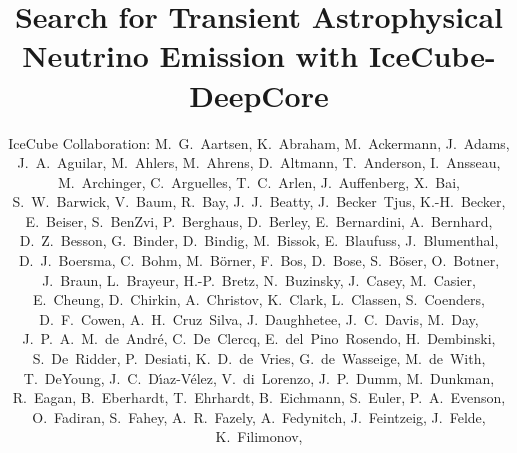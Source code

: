 \documentclass[manuscript]{aastex}
\begin{document}
\title{Search for Transient Astrophysical Neutrino Emission with IceCube-DeepCore}
\author{
IceCube Collaboration:
M.~G.~Aartsen,
K.~Abraham,
M.~Ackermann,
J.~Adams,
J.~A.~Aguilar,
M.~Ahlers,
M.~Ahrens,
D.~Altmann,
T.~Anderson,
I.~Ansseau,
M.~Archinger,
C.~Arguelles,
T.~C.~Arlen,
J.~Auffenberg,
X.~Bai,
S.~W.~Barwick,
V.~Baum,
R.~Bay,
J.~J.~Beatty,
J.~Becker~Tjus,
K.-H.~Becker,
E.~Beiser,
S.~BenZvi,
P.~Berghaus,
D.~Berley,
E.~Bernardini,
A.~Bernhard,
D.~Z.~Besson,
G.~Binder,
D.~Bindig,
M.~Bissok,
E.~Blaufuss,
J.~Blumenthal,
D.~J.~Boersma,
C.~Bohm,
M.~B\"orner,
F.~Bos,
D.~Bose,
S.~B\"oser,
O.~Botner,
J.~Braun,
L.~Brayeur,
H.-P.~Bretz,
N.~Buzinsky,
J.~Casey,
M.~Casier,
E.~Cheung,
D.~Chirkin,
A.~Christov,
K.~Clark,
L.~Classen,
S.~Coenders,
D.~F.~Cowen,
A.~H.~Cruz~Silva,
J.~Daughhetee,
J.~C.~Davis,
M.~Day,
J.~P.~A.~M.~de~Andr\'e,
C.~De~Clercq,
E.~del~Pino~Rosendo,
H.~Dembinski,
S.~De~Ridder,
P.~Desiati,
K.~D.~de~Vries,
G.~de~Wasseige,
M.~de~With,
T.~DeYoung,
J.~C.~D{\'\i}az-V\'elez,
V.~di~Lorenzo,
J.~P.~Dumm,
M.~Dunkman,
R.~Eagan,
B.~Eberhardt,
T.~Ehrhardt,
B.~Eichmann,
S.~Euler,
P.~A.~Evenson,
O.~Fadiran,
S.~Fahey,
A.~R.~Fazely,
A.~Fedynitch,
J.~Feintzeig,
J.~Felde,
K.~Filimonov,
}
\end{document}
